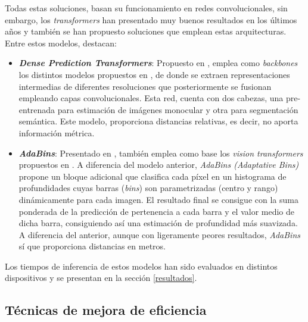 \documentclass[a4paper, 11pt]{article}
\newcommand{\textbfit}[1]{\textbf{\textit{#1}}}
\begin{document}
Todas estas soluciones, basan su funcionamiento en redes convolucionales, sin embargo, los \textit{transformers} han presentado muy buenos resultados en los últimos años y también se han propuesto soluciones que emplean estas arquitecturas. Entre estos modelos, destacan:
\begin{itemize}
    \item \textbfit{Dense Prediction Transformers}: Propuesto en \cite{visiontransformersDPT}, emplea como \textit{backbones} los distintos modelos propuestos en \cite{image16x16words}, de donde se extraen representaciones intermedias de diferentes resoluciones que posteriormente se fusionan empleando capas convolucionales. Esta red, cuenta con dos cabezas, una pre-entrenada para estimación de imágenes monocular y otra para segmentación semántica. Este modelo, proporciona distancias relativas, es decir, no aporta información métrica.
    \item \textbfit{AdaBins}: Presentado en \cite{bhat2020adabins}, también emplea como base los \textit{vision transformers} propuestos en \cite{image16x16words}. A diferencia del modelo anterior, \textit{AdaBins (Adaptative Bins)} propone un bloque adicional que clasifica cada píxel en un histograma de profundidades cuyas barras (\textit{bins}) son parametrizadas (centro y rango) dinámicamente para cada imagen. El resultado final se consigue con la suma ponderada de la predicción de pertenencia a cada barra y el valor medio de dicha barra, consiguiendo así una estimación de profundidad más suavizada. A diferencia del anterior, aunque con ligeramente peores resultados, \textit{AdaBins} sí que proporciona distancias en metros.
\end{itemize}
Los tiempos de inferencia de estos modelos han sido evaluados en distintos dispositivos y se presentan en la sección \ref{resultados}.

\subsection{Técnicas de mejora de eficiencia} \label{eficiencia-general}

\end{document}
